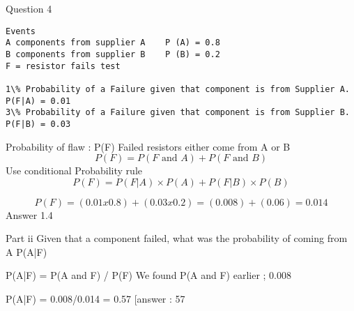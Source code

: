 Question 4


\begin{verbatim}
Events 
A components from supplier A  	P (A) = 0.8 
B components from supplier B  	P (B) = 0.2 
F = resistor fails test

1\% Probability of a Failure given that component is from Supplier A.      P(F|A) = 0.01
3\% Probability of a Failure given that component is from Supplier B.      P(F|B) = 0.03

\end{verbatim}
Probability of flaw : P(F)
Failed resistors either come from A or B
\[	P( F) =  P ( F \mbox{ and } A)  +  P( F \mbox{ and } B)\]
Use conditional Probability  rule		
\[P(F) = P(F|A)\times P(A)  + P(F|B)\times P(B)\]

\[P(F)  =  ( 0.01 x 0.8 ) + ( 0.03 x 0.2) = (0.008) + (0.06) = 0.014	\]
	Answer 1.4%

Part ii
Given that a component failed, what was the probability of coming from A
P(A|F) 

P(A|F) = P(A and F)  / P(F)		We found P(A and F) earlier ; 0.008

P(A|F) = 0.008/0.014 =  0.57			[answer : 57%
